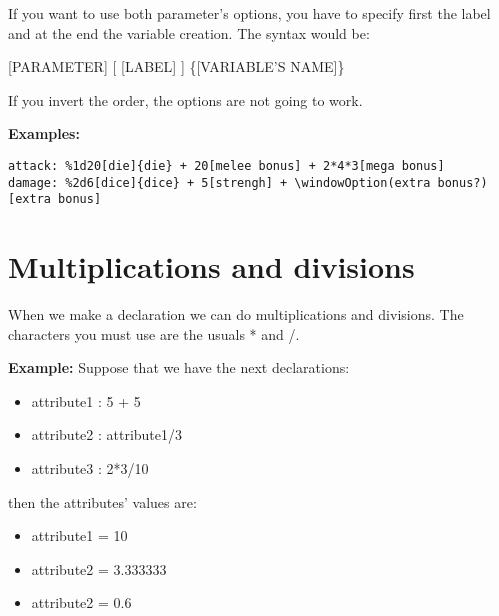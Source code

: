 \documentclass[11pt,a4paper,openright,oneside]{book}
\newenvironment{exs}
{
  \setlength{\parindent}{0cm}
  \large \textbf{Examples:} \normalsize
}
{}
\newenvironment{ex}
{
  \setlength{\parindent}{0cm}
  \large \textbf{Example:} \normalsize 
}
{}
\begin{document}
If you want to use both parameter's options, you have to specify first the label and at the end the variable creation. The syntax would be:
\begin{center} \small \textsf{\textsc{\scriptsize[PARAMETER]} [ \textsc{\scriptsize[LABEL]} ] \{\textsc{\scriptsize[VARIABLE'S NAME]}\} } \normalsize \end{center}

If you invert the order, the options are not going to work.

\begin{exs}
\scriptsize
  \begin{lstlisting}
attack: %1d20[die]{die} + 20[melee bonus] + 2*4*3[mega bonus]
damage: %2d6[dice]{dice} + 5[strengh] + \windowOption(extra bonus?)[extra bonus]
  \end{lstlisting}
\end{exs}

\section{Multiplications and divisions}

When we make a declaration we can do multiplications and divisions. The characters you must use are the usuals \textsf{*} and \textsf{/}.

\begin{ex} Suppose that we have the next declarations:
  \begin{itemize}
    \item \textsf{attribute1 : 5 + 5}
    \item \textsf{attribute2 : attribute1/3}
    \item \textsf{attribute3 : 2*3/10}
  \end{itemize}
\end{ex}
then the attributes' values are:
\begin{itemize}
  \item \textsf{attribute1 = 10}
  \item \textsf{attribute2 = 3.333333}
  \item \textsf{attribute2 = 0.6}
\end{itemize}
\end{document}
